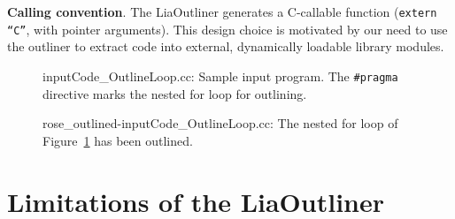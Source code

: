 \textbf{Calling convention}. The LiaOutliner generates a C-callable
function (\texttt{extern ``C''}, with pointer arguments). This design
choice is motivated by our need to use the outliner to extract code
into external, dynamically loadable library modules.

\begin{figure}[!b]
{\indent
{\mySmallFontSize
\begin{latexonly}
   
\end{latexonly}
\begin{htmlonly}
   
\end{htmlonly}

}
}
\caption{inputCode\_OutlineLoop.cc: Sample input program. The \texttt{\#pragma} directive marks the nested for loop for outlining.}
\label{fig:liaOutliner:input1}
\end{figure}

\begin{figure}[!h]
{\indent
{\mySmallFontSize
\begin{latexonly}
   
\end{latexonly}
\begin{htmlonly}
   
\end{htmlonly}

}
}
\caption{rose\_outlined-inputCode\_OutlineLoop.cc: The nested for loop of Figure~\ref{fig:liaOutliner:input1} has been outlined.}
\label{fig:liaOutliner:output1}
\end{figure}

\section{Limitations of the LiaOutliner}
\label{sec:liaOutliner:limits}

